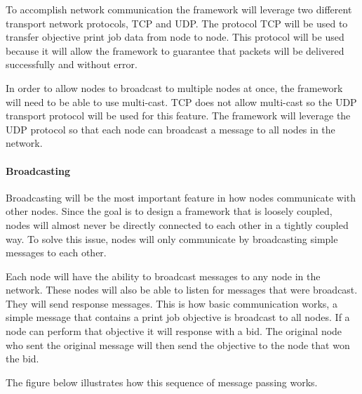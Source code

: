 \documentclass[draftclsnofoot, onecolumn, compsoc, 10pt]{IEEEtran}
\begin{document}
To accomplish network communication the framework will leverage two different transport network protocols, TCP and UDP. The protocol TCP will be used to transfer objective print job data from node to node. This protocol will be used because it will allow the framework to guarantee that packets will be delivered successfully and without error. 

In order to allow nodes to broadcast to multiple nodes at once, the framework will need to be able to use multi-cast. TCP does not allow multi-cast so the UDP transport protocol will be used for this feature. The framework will leverage the UDP protocol so that each node can broadcast a message to all nodes in the network. 

\paragraph{Broadcasting}
Broadcasting will be the most important feature in how nodes communicate with other nodes. Since the goal is to design a framework that is loosely coupled, nodes will almost never be directly connected to each other in a tightly coupled way. To solve this issue, nodes will only communicate by broadcasting simple messages to each other.

Each node will have the ability to broadcast messages to any node in the network. These nodes will also be able to listen for messages that were broadcast. They will send response messages. This is how basic communication works, a simple message that contains a print job objective is broadcast to all nodes. If a node can perform that objective it will response with a bid. The original node who sent the original message will then send the objective to the node that won the bid. 

The figure below illustrates how this sequence of message passing works.
\end{document}
